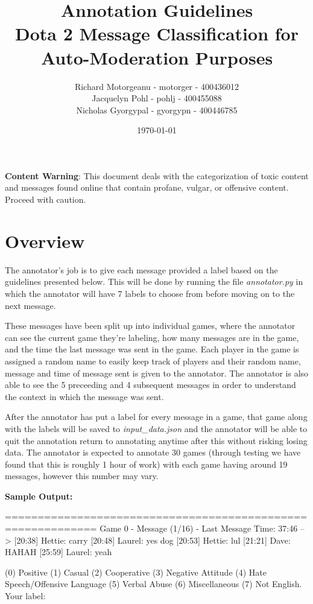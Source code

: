\documentclass[11pt, letterpaper, notitlepage]{article}
\title{Annotation Guidelines \\ Dota 2 Message Classification for Auto-Moderation Purposes}
\author{Richard Motorgeanu - motorger - 400436012\\ Jacquelyn Pohl - pohlj - 400455088\\ Nicholas Gyorgypal - gyorgypn - 400446785}
\date{\today}
\begin{document}
\maketitle


\vspace{6em}

\large
\textbf{Content Warning}: This document deals with the categorization of toxic content and messages found online that contain profane, vulgar, or offensive content. Proceed with caution.

\vspace{2em}

\newpage

\section[1]{Overview}

The annotator's job is to give each message provided a label based on the guidelines presented below.
This will be done by running the file \textit{annotator.py} in which the annotator will have 7 labels to choose from before moving on to the next message.

These messages have been split up into individual games, where the annotator can see the current game they're labeling, how many messages are in the game, and the time the last message was sent in the game.
Each player in the game is assigned a random name to easily keep track of players and their random name, message and time of message sent is given to the annotator.
The annotator is also able to see the 5 preceeding and 4 subsequent messages in order to understand the context in which the message was sent.

After the annotator has put a label for every message in a game, that game along with the labels will be saved to \textit{input\_data.json} and the annotator will be able to quit the annotation return to annotating anytime after this without risking losing data.
The annotator is expected to annotate 30 games (through testing we have found that this is roughly 1 hour of work) with each game having around 19 messages, however this number may vary.

\vspace{2em}

\textbf{Sample Output:}
\begin{python}
============================================================
Game 0 - Message (1/16) - Last Message Time: 37:46
--> [20:38] Hettie: carry
    [20:48] Laurel: yes dog
    [20:53] Hettie: lul
    [21:21] Dave: HAHAH
    [25:59] Laurel: yeah 

(0) Positive (1) Casual (2) Cooperative (3) Negative Attitude (4) Hate Speech/Offensive Language (5) Verbal Abuse (6) Miscellaneous (7) Not English.
Your label: 
\end{python}
\end{document}
